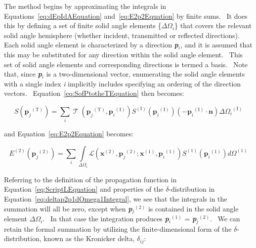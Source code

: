 The method begins by approximating the integrals in Equations~\ref{eq:dEpIdAEquation} and~\ref{eq:E2p2Equation} by finite sums.~ It does this by defining a set of finite solid angle elements \{\(\Delta {\Omega_i}\)\} that covers the relevant solid angle hemisphere (whether incident, transmitted or reflected directions).~ Each solid angle element is characterized by a direction \textbf{\emph{p}}\emph{\(_{i}\)}, and it is assumed that this may be substituted for any direction within the solid angle element.~ This set of solid angle elements and corresponding directions is termed a basis.~ Note that, since \textbf{\emph{p}}\emph{\(_{i}\)} is a two-dimensional vector, enumerating the solid angle elements with a single index \emph{i} implicitly includes specifying an ordering of the direction vectors.~ Equation~\ref{eq:SofPtotheTEquation} then becomes:

\begin{equation}
S({{\mathbf{p}}_j}^{{\mathrm{(T)}}}) = \sum\limits_i {\operatorname{\mathcal{T}} ({{\mathbf{p}}_j}^{{\mathrm{(T)}}},{{\mathbf{p}}_i}^{{\mathrm{(I)}}}){S^{{\mathrm{(I)}}}}({{\mathbf{p}}_i}^{{\mathrm{(I)}}})\left( { - {{\mathbf{p}}_i}^{{\mathrm{(I)}}}\cdot {\mathbf{n}}} \right)\Delta {\Omega_i}^{{\mathrm{(I)}}}}
\label{eq:SofptotheTmodifiedEquation}
\end{equation}

and Equation~\ref{eq:E2p2Equation} becomes:

\begin{equation}
{E^{(2)}}({{\mathbf{p}}_j}^{{\mathrm{(2)}}}) = \sum\limits_i {\int\limits_{\Delta {\Omega_i}} {\mathcal{L}({{\mathbf{x}}^{{\mathrm{(2)}}}},{{\mathbf{p}}_j}^{{\mathrm{(2)}}};{{\mathbf{x}}^{{\mathrm{(1)}}}},{{\mathbf{p}}_i}^{{\mathrm{(1)}}}){S^{{\mathrm{(1)}}}}({{\mathbf{p}}_i}^{{\mathrm{(1)}}})d{\Omega ^{{\mathrm{(1)}}}}} }
\end{equation}

Referring to the definition of the propagation function in Equation~\ref{eq:ScriptLEquation} and properties of the \(\delta\)-distribution in Equation~\ref{eq:deltap2p1dOmega1Integral}, we see that the integrals in the summation will all be zero, except when \textbf{\emph{p}}\emph{\(_{j}\)}\(^{(2)}\) is contained in the solid angle element \(\Delta\)\(\Omega\)\emph{\(_{i}\)}.~ In that case the integration produces \textbf{\emph{p}}\emph{\(_{i}\)}\(^{(1)}\) = \textbf{\emph{p}}\emph{\(_{j}\)}\(^{(2)}\).~ We can retain the formal summation by utilizing the finite-dimensional form of the \(\delta\)-distribution, known as the Kronicker delta, \(\delta\)\emph{\(_{ij}\)}:

